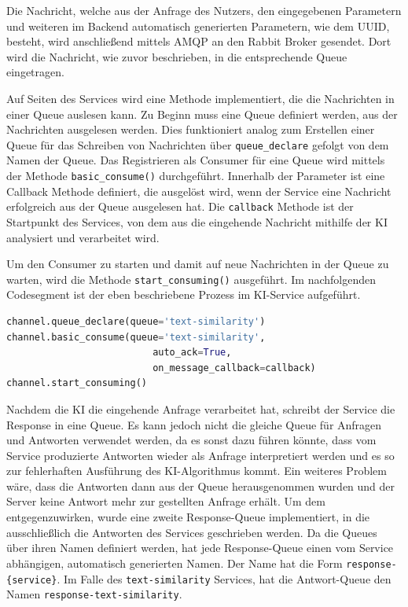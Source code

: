 Die Nachricht, welche aus der Anfrage des Nutzers, den eingegebenen Parametern und weiteren im Backend automatisch generierten Parametern, wie dem UUID, besteht, wird anschließend mittels AMQP an den Rabbit Broker gesendet. Dort wird die Nachricht, wie zuvor beschrieben, in die entsprechende Queue eingetragen. 

Auf Seiten des Services wird eine Methode implementiert, die die Nachrichten in einer Queue auslesen kann. Zu Beginn muss eine Queue definiert werden, aus der Nachrichten ausgelesen werden. Dies funktioniert analog zum Erstellen einer Queue für das Schreiben von Nachrichten über \texttt{queue\_{}declare} gefolgt von dem Namen der Queue. Das Registrieren als Consumer für eine Queue wird mittels der Methode \texttt{basic\_{}consume()} durchgeführt. Innerhalb der Parameter ist eine Callback Methode definiert, die ausgelöst wird, wenn der Service eine Nachricht erfolgreich aus der Queue ausgelesen hat. Die \texttt{callback} Methode ist der Startpunkt des Services, von dem aus die eingehende Nachricht mithilfe der KI analysiert und verarbeitet wird.

Um den Consumer zu starten und damit auf neue Nachrichten in der Queue zu warten, wird die Methode \texttt{start\_{}consuming()} ausgeführt. Im nachfolgenden Codesegment ist der eben beschriebene Prozess im KI-Service aufgeführt.

\begin{lstlisting}[language=Python, caption={Aufsetzen und Konsumieren der RabbitMQ-Queue im KI-Service}]
channel.queue_declare(queue='text-similarity')
channel.basic_consume(queue='text-similarity',
                          auto_ack=True,
                          on_message_callback=callback)
channel.start_consuming()
\end{lstlisting}

Nachdem die KI die eingehende Anfrage verarbeitet hat, schreibt der Service die Response in eine Queue. Es kann jedoch nicht die gleiche Queue für Anfragen und Antworten verwendet werden, da es sonst dazu führen könnte, dass vom Service produzierte Antworten wieder als Anfrage interpretiert werden und es so zur fehlerhaften Ausführung des KI-Algorithmus kommt. Ein weiteres Problem wäre, dass die Antworten dann aus der Queue herausgenommen wurden und der Server keine Antwort mehr zur gestellten Anfrage erhält. Um dem entgegenzuwirken, wurde eine zweite Response-Queue implementiert, in die ausschließlich die Antworten des Services geschrieben werden. Da die Queues über ihren Namen definiert werden, hat jede Response-Queue einen vom Service abhängigen, automatisch generierten Namen. Der Name hat die Form \texttt{response-\{service\}}. Im Falle des \texttt{text-similarity} Services, hat die Antwort-Queue den Namen \texttt{response-text-similarity}. 

